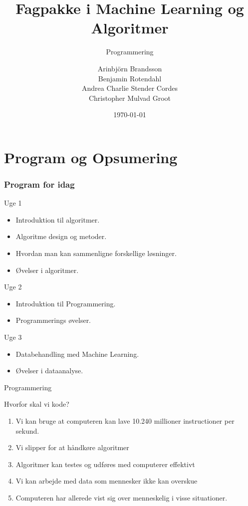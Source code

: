 \documentclass[12pt,t]{beamer}
\title{Fagpakke i Machine Learning og Algoritmer}
\subtitle{Programmering}
\author{
Arinbjörn Brandsson \\
Benjamin Rotendahl  \\
Andrea Charlie Stender Cordes \\
Christopher Mulvad Groot\\
}
\date[]{\today}
\begin{document}
\frame[plain]{\titlepage}
 \frame{\tableofcontents}

\section{Program og Opsumering}

\begin{frame}
    \frametitle{Program for idag}
    \begin{block}{Uge 1}
        \begin{itemize}
            \item Introduktion til algoritmer.
            \item Algoritme design og metoder.
            \item Hvordan man kan sammenligne forskellige løsninger.
            \item Øvelser i algoritmer.
        \end{itemize}
    \end{block}
    \begin{block}{Uge 2}
        \begin{itemize}
            \item \alert{Introduktion til Programmering.}
            \item \alert{Programmerings øvelser.}
        \end{itemize}
    \end{block}
    \begin{block}{Uge 3}
        \begin{itemize}
            \item Databehandling med Machine Learning.
            \item Øvelser i dataanalyse.
        \end{itemize}
    \end{block}
\end{frame}

\begin{frame}{Programmering}
        \begin{block}{Hvorfor skal vi kode?}
            \begin{enumerate}
                \item Vi kan bruge at computeren kan lave 10.240 millioner
                      instructioner per sekund. \pause
                \item Vi slipper for at håndkøre algoritmer \pause
                \item Algoritmer kan testes og udføres med computerer effektivt \pause
                \item Vi kan arbejde med data som mennesker ikke kan overskue \pause
                \item Computeren har allerede vist sig over menneskelig i visse
                situationer.
            \end{enumerate}
        \end{block}
    \end{frame}
\end{document}
